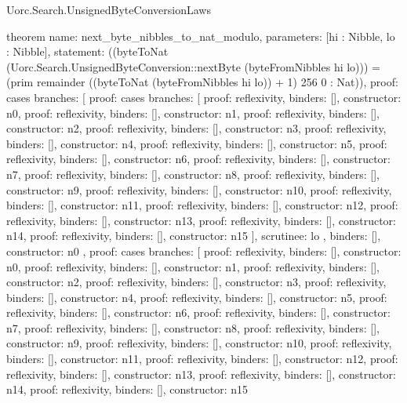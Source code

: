 \begin{lexlean}{Uorc.Search.UnsignedByteConversionLaws}
\begin{semanticmodule}
theorem{
  name: next_byte_nibbles_to_nat_modulo,
  parameters: [hi : Nibble, lo : Nibble],
  statement: ((byteToNat (Uorc.Search.UnsignedByteConversion::nextByte (byteFromNibbles hi lo))) = (prim remainder ((byteToNat (byteFromNibbles hi lo)) + 1) 256 0 : Nat)),
  proof: cases{
    branches: [
      {
        proof: cases{
          branches: [
            {proof: reflexivity{}, binders: [], constructor: n0},
            {proof: reflexivity{}, binders: [], constructor: n1},
            {proof: reflexivity{}, binders: [], constructor: n2},
            {proof: reflexivity{}, binders: [], constructor: n3},
            {proof: reflexivity{}, binders: [], constructor: n4},
            {proof: reflexivity{}, binders: [], constructor: n5},
            {proof: reflexivity{}, binders: [], constructor: n6},
            {proof: reflexivity{}, binders: [], constructor: n7},
            {proof: reflexivity{}, binders: [], constructor: n8},
            {proof: reflexivity{}, binders: [], constructor: n9},
            {proof: reflexivity{}, binders: [], constructor: n10},
            {proof: reflexivity{}, binders: [], constructor: n11},
            {proof: reflexivity{}, binders: [], constructor: n12},
            {proof: reflexivity{}, binders: [], constructor: n13},
            {proof: reflexivity{}, binders: [], constructor: n14},
            {proof: reflexivity{}, binders: [], constructor: n15}
          ],
          scrutinee: lo
        },
        binders: [],
        constructor: n0
      },
      {
        proof: cases{
          branches: [
            {proof: reflexivity{}, binders: [], constructor: n0},
            {proof: reflexivity{}, binders: [], constructor: n1},
            {proof: reflexivity{}, binders: [], constructor: n2},
            {proof: reflexivity{}, binders: [], constructor: n3},
            {proof: reflexivity{}, binders: [], constructor: n4},
            {proof: reflexivity{}, binders: [], constructor: n5},
            {proof: reflexivity{}, binders: [], constructor: n6},
            {proof: reflexivity{}, binders: [], constructor: n7},
            {proof: reflexivity{}, binders: [], constructor: n8},
            {proof: reflexivity{}, binders: [], constructor: n9},
            {proof: reflexivity{}, binders: [], constructor: n10},
            {proof: reflexivity{}, binders: [], constructor: n11},
            {proof: reflexivity{}, binders: [], constructor: n12},
            {proof: reflexivity{}, binders: [], constructor: n13},
            {proof: reflexivity{}, binders: [], constructor: n14},
            {proof: reflexivity{}, binders: [], constructor: n15}
}}}}
\end{semanticmodule}
\end{lexlean}
